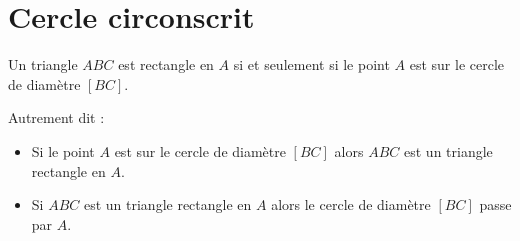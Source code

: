 





\section{Cercle circonscrit}

\begin{propriete}
    Un triangle \( ABC\) est rectangle en \( A\) si et seulement si le point \( A\) est sur le cercle de diamètre \( [BC]\).
\end{propriete}
Autrement dit :
\begin{itemize}
    \item Si le point \( A\) est sur le cercle de diamètre \( [BC]\) alors \( ABC\) est un triangle rectangle en \( A\).
    \item Si \( ABC\) est un triangle rectangle en \( A\) alors le cercle de diamètre \( [BC]\) passe par \( A\).
\end{itemize}

\begin{center}
   
\end{center}



